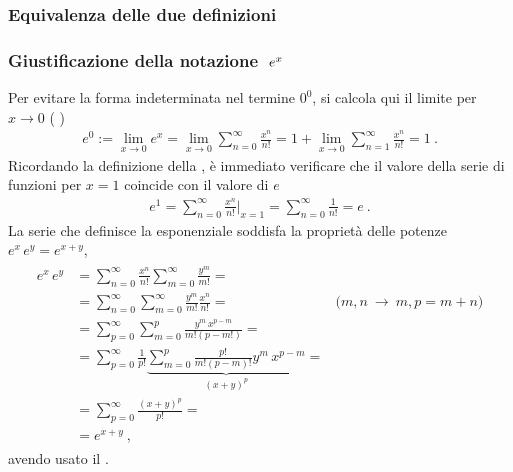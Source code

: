 \documentclass[letterpaper,10pt,italian]{jupyterBook}
\begin{document}
\subsubsection*{Equivalenza delle due definizioni}

\sphinxAtStartPar
{}
\label{\detokenize{ch/exponential_logarithm-proof:math-hs-exp-log-proof-powers}}

\subsubsection*{Giustificazione della notazione \protect\(\ e^x\protect\) }

\sphinxAtStartPar
Per evitare la forma indeterminata nel termine \(0^0\), si calcola qui il limite per \(x \rightarrow 0\) ( )
\begin{equation*}
\begin{split}e^0 := \lim_{x \rightarrow 0} e^x = \lim_{x \rightarrow 0} \sum_{n = 0}^{\infty} \frac{x^n}{n!} = 1 + \lim_{x \rightarrow 0} \sum_{n=1}^{\infty} \frac{x^n}{n!} = 1 \ .\end{split}
\end{equation*}
\sphinxAtStartPar
Ricordando la definizione della {\hyperref[\detokenize{ch/series:math-hs-series-e-euler}]{}}, è immediato verificare che il valore della serie di funzioni per \(x = 1\) coincide con il valore di \(e\)
\begin{equation*}
\begin{split}e^1 = \sum_{n=0}^{\infty} \frac{x^n}{n!} \bigg|_{x=1} = \sum_{n=0}^{\infty} \frac{1}{n!} = e \ .\end{split}
\end{equation*}
\sphinxAtStartPar
La serie che definisce la esponenziale soddisfa la proprietà delle potenze \(e^x \, e^y = e^{x+y}\),
\begin{equation*}
\begin{split}\begin{aligned}
  e^x \, e^y 
  & = \sum_{n=0}^{\infty} \frac{x^n}{n!} \sum_{m = 0}^{\infty} \frac{y^m}{m!} = \\
  & = \sum_{n=0}^{\infty} \sum_{m=0}^{\infty} \frac{y^m}{m!} \frac{x^n}{n!} =  & \text{($m,n \  \rightarrow \ m,p=m+n$)}\\
  & = \sum_{p=0}^{\infty} \sum_{m=0}^{p} \frac{y^m \, x^{p-m}}{m! (p-m!)} = \\
  & = \sum_{p=0}^{\infty} \frac{1}{p!} \underbrace{\sum_{m=0}^{p} \frac{p!}{m! (p-m)!} y^m \, x^{p-m}}_{(x+y)^p} = \\
  & = \sum_{p=0}^{\infty} \frac{(x+y)^p}{p!} = \\
  & = e^{x+y} \ ,
\end{aligned}\end{split}
\end{equation*}
\sphinxAtStartPar
avendo usato il {\hyperref[\detokenize{ch/precalculus/polynomials:math-hs-precalculus-polynomials-binomial-thm}]{}}.
\end{document}
